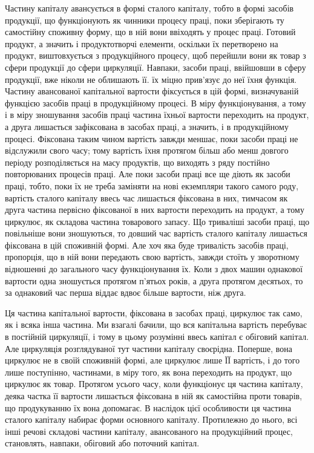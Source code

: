 Частину капіталу авансується в формі сталого капіталу, тобто в формі
засобів продукції, що функціонують як чинники процесу праці, поки
зберігають ту самостійну споживну форму, що в ній вони ввіходять
у процес праці. Готовий продукт, а значить і продуктотворчі елементи,
оскільки їх перетворено на продукт, виштовхується з продукційного
процесу, щоб перейшли вони як товар з сфери продукції до сфери циркуляції.
Навпаки, засоби праці, ввійшовши в сферу продукції, вже ніколи
не облишають її. їх міцно прив’язує до неї їхня функція. Частину
авансованої капітальної вартости фіксується в цій формі, визначуваній
функцією засобів праці в продукційному процесі. В міру функціонування,
а тому і в міру зношування засобів праці частина їхньої вартости
переходить на продукт, а друга лишається зафіксована в засобах
праці, а значить, і в продукційному процесі. Фіксована таким чином
вартість завжди меншає, поки засоби праці не відслужили свого часу;
тому вартість їхня протягом більш або менш довгого періоду розподіляється
на масу продуктів, що виходять з ряду постійно повторюваних
процесів праці. Але поки засоби праці все ще діють як засоби праці,
тобто, поки їх не треба заміняти на нові екземпляри такого самого роду,
вартість сталого капіталу ввесь час лишається фіксована в них, тимчасом
як друга частина первісно фіксованої в них вартости переходить на
продукт, а тому циркулює, як складова частина товарового запасу. Що
триваліші засоби праці, що повільніше вони зношуються, то довший час
вартість сталого капіталу лишається фіксована в цій споживній формі.
Але хоч яка буде тривалість засобів праці, пропорція, що в ній вони
передають свою вартість, завжди стоїть у зворотному відношенні до
загального часу функціонування їх. Коли з двох машин однакової
вартости одна зношується протягом п’ятьох років, а друга протягом десятьох,
то за однаковий час перша віддає вдвоє більше вартости, ніж
друга.

Ця частина капітальної вартости, фіксована в засобах праці, циркулює
так само, як і всяка інша частина. Ми взагалі бачили, що вся капітальна
вартість перебуває в постійній циркуляції, і тому в цьому розумінні
ввесь капітал є обіговий капітал. Але циркуляція розглядуваної
тут частини капіталу своєрідна. Поперше, вона циркулює не в своїй
споживній формі, але циркулює лише ЇЇ вартість, і до того лише поступінно,
частинами, в міру того, як вона переходить на продукт, що циркулює
як товар. Протягом усього часу, коли функціонує ця частина капіталу,
деяка частка її вартости лишається фіксована в ній як самостійна
проти товарів, що продукуванню їх вона допомагає. В наслідок цієї
особливости ця частина сталого капіталу набирає форми основного
капіталу. Протилежно до нього, всі інші речові складові частини капіталу,
авансованого на продукційний процес, становлять, навпаки, обіговий
або поточний капітал.

